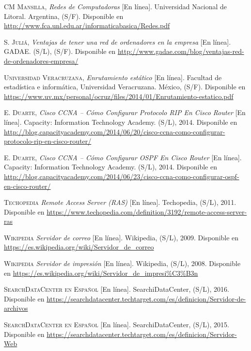 
\begin{thebibliography}{X}
		\textsc{CM Mansilla,}
		\textit{Redes de Computadoras} [En línea].
		Universidad Nacional de Litoral. Argentina, (S/F). 
		\newline
		Disponible en 
		\url{http://www.fca.unl.edu.ar/informaticabasica/Redes.pdf}

		\textsc{S. Juliá,}
		\textit{Ventajas de tener una red de ordenadores en la empresa} [En línea].
		GADAE. (S/L), (S/F). 
		\newline
		Disponible en 
		\url{http://www.gadae.com/blog/ventajas-red-de-ordenadores-empresa/}

		\textsc{Universidad Veracruzana,}
		\textit{Enrutamiento estático} [En línea].
		Facultad de estadística e informática, Universidad Veracruzana. México, (S/F). 
		\newline
		Disponible en 
		\url{https://www.uv.mx/personal/ocruz/files/2014/01/Enrutamiento-estatico.pdf}

		\textsc{E. Duarte,}
		\textit{Cisco CCNA – Cómo Configurar Protocolo RIP En Cisco Router} [En línea].
		Capacity: Information Technology Academy. (S/L), 2014. 
		\newline
		Disponible en 
		\url{http://blog.capacityacademy.com/2014/06/20/cisco-ccna-como-configurar-protocolo-rip-en-cisco-router/}
		
		\textsc{E. Duarte,}
		\textit{Cisco CCNA – Cómo Configurar OSPF En Cisco Router} [En línea].
		Capacity: Information Technology Academy. (S/L), 2014. 
		\newline
		Disponible en 
		\url{http://blog.capacityacademy.com/2014/06/23/cisco-ccna-como-configurar-ospf-en-cisco-router/}

		\textsc{Techopedia}
		\textit{Remote Access Server (RAS)} [En línea].
		Techopedia, (S/L), 2011.
		\newline
		Disponible en
		\url{https://www.techopedia.com/definition/3192/remote-access-server-ras}

		\textsc{Wikipedia}
		\textit{Servidor de correo} [En línea].
		Wikipedia, (S/L), 2009.
		\newline
		Disponible en
		\url{https://es.wikipedia.org/wiki/Servidor_de_correo}
		
		\textsc{Wikipedia}
		\textit{Servidor de impresión} [En línea].
		Wikipedia, (S/L), 2008.
		\newline
		Disponible en
		\url{https://es.wikipedia.org/wiki/Servidor_de_impresi\%C3\%B3n}

		\textsc{SearchDataCenter en Español} [En línea].
		SearchiDataCenter, (S/L), 2016.
		\newline
		Disponible en
		\url{https://searchdatacenter.techtarget.com/es/definicion/Servidor-de-archivos}

		\textsc{SearchDataCenter en Español} [En línea].
		SearchiDataCenter, (S/L), 2015.
		\newline
		Disponible en
		\url{https://searchdatacenter.techtarget.com/es/definicion/Servidor-Web}
\end{thebibliography}

